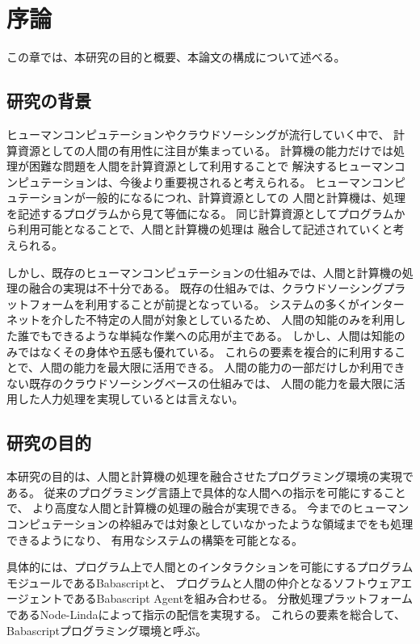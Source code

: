 \chapter{序論}\label{chap:introduction}

この章では、本研究の目的と概要、本論文の構成について述べる。

\newpage

\section{研究の背景}\label{ux7814ux7a76ux306eux80ccux666f}

ヒューマンコンピュテーションやクラウドソーシングが流行していく中で、
計算資源としての人間の有用性に注目が集まっている。
計算機の能力だけでは処理が困難な問題を人間を計算資源として利用することで
解決するヒューマンコンピュテーションは、今後より重要視されると考えられる。
ヒューマンコンピュテーションが一般的になるにつれ、計算資源としての
人間と計算機は、処理を記述するプログラムから見て等価になる。
同じ計算資源としてプログラムから利用可能となることで、人間と計算機の処理は
融合して記述されていくと考えられる。

しかし、既存のヒューマンコンピュテーションの仕組みでは、人間と計算機の処理の融合の実現は不十分である。
既存の仕組みでは、クラウドソーシングプラットフォームを利用することが前提となっている。
システムの多くがインターネットを介した不特定の人間が対象としているため、
人間の知能のみを利用した誰でもできるような単純な作業への応用が主である。
しかし、人間は知能のみではなくその身体や五感も優れている。
これらの要素を複合的に利用することで、人間の能力を最大限に活用できる。
人間の能力の一部だけしか利用できない既存のクラウドソーシングベースの仕組みでは、
人間の能力を最大限に活用した人力処理を実現しているとは言えない。

\section{研究の目的}\label{ux7814ux7a76ux306eux76eeux7684}

本研究の目的は、人間と計算機の処理を融合させたプログラミング環境の実現である。
従来のプログラミング言語上で具体的な人間への指示を可能にすることで、
より高度な人間と計算機の処理の融合が実現できる。
今までのヒューマンコンピュテーションの枠組みでは対象としていなかったような領域までをも処理できるようになり、
有用なシステムの構築を可能となる。

具体的には、プログラム上で人間とのインタラクションを可能にするプログラムモジュールであるBabascriptと、
プログラムと人間の仲介となるソフトウェアエージェントであるBabascript
Agentを組み合わせる。
分散処理プラットフォームであるNode-Lindaによって指示の配信を実現する。
これらの要素を総合して、Babascriptプログラミング環境と呼ぶ。

